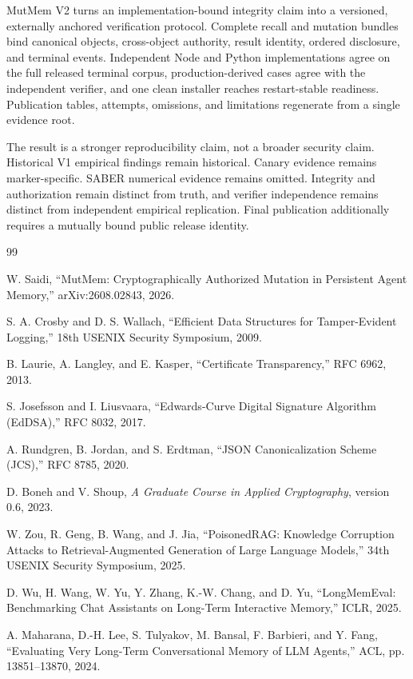 \documentclass[10pt]{article}
\begin{document}
MutMem V2 turns an implementation-bound integrity claim into a versioned,
externally anchored verification protocol. Complete recall and mutation bundles
bind canonical objects, cross-object authority, result identity, ordered
disclosure, and terminal events. Independent Node and Python implementations
agree on the full released terminal corpus, production-derived cases agree with
the independent verifier, and one clean installer reaches restart-stable
readiness. Publication tables, attempts, omissions, and limitations regenerate
from a single evidence root.

The result is a stronger reproducibility claim, not a broader security claim.
Historical V1 empirical findings remain historical. Canary evidence remains
marker-specific. SABER numerical evidence remains omitted. Integrity and
authorization remain distinct from truth, and verifier independence remains
distinct from independent empirical replication. Final publication additionally
requires a mutually bound public release identity.

\begin{thebibliography}{99}

W. Saidi,
``MutMem: Cryptographically Authorized Mutation in Persistent Agent Memory,''
arXiv:2608.02843, 2026.

S. A. Crosby and D. S. Wallach,
``Efficient Data Structures for Tamper-Evident Logging,''
18th USENIX Security Symposium, 2009.

B. Laurie, A. Langley, and E. Kasper,
``Certificate Transparency,'' RFC 6962, 2013.

S. Josefsson and I. Liusvaara,
``Edwards-Curve Digital Signature Algorithm (EdDSA),'' RFC 8032, 2017.

A. Rundgren, B. Jordan, and S. Erdtman,
``JSON Canonicalization Scheme (JCS),'' RFC 8785, 2020.

D. Boneh and V. Shoup,
\emph{A Graduate Course in Applied Cryptography}, version 0.6, 2023.

W. Zou, R. Geng, B. Wang, and J. Jia,
``PoisonedRAG: Knowledge Corruption Attacks to Retrieval-Augmented Generation
of Large Language Models,'' 34th USENIX Security Symposium, 2025.

D. Wu, H. Wang, W. Yu, Y. Zhang, K.-W. Chang, and D. Yu,
``LongMemEval: Benchmarking Chat Assistants on Long-Term Interactive Memory,''
ICLR, 2025.

A. Maharana, D.-H. Lee, S. Tulyakov, M. Bansal, F. Barbieri, and Y. Fang,
``Evaluating Very Long-Term Conversational Memory of LLM Agents,''
ACL, pp. 13851--13870, 2024.

\end{thebibliography}
\end{document}
